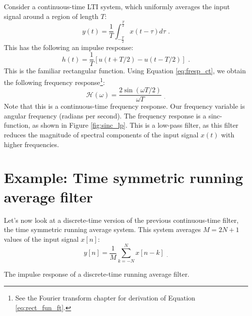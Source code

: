 Consider a continuous-time LTI system, which uniformly averages the
input signal around a region of length $T$:
\begin{equation}
y(t) = \frac{1}{T}\int_{-\frac{T}{2}}^{\frac{T}{2}} x(t-\tau)d\tau \,\,.
\end{equation}
This has the following an impulse response:
\begin{equation}
h(t)=\frac{1}{T}[u(t+T/2)-u(t-T/2)] \,\,.
\label{eq:rect_fun}
\end{equation}
This is the familiar rectangular function. Using
Equation \ref{eq:fresp_ct}, we obtain the following frequency
response\footnote{See the Fourier transform chapter for derivation of Equation \ref{eq:rect_fun_ft}.}:
\begin{equation}
\mathcal{H}(\omega)=\frac{2\sin(\omega T/2)}{\omega T} \,\, _.
\label{eq:rect_fun_ft}
\end{equation}
Note that this is a continuous-time frequency response. Our frequency
variable is angular frequency (radians per second). The frequency
response is a sinc-function, as shown in
Figure \ref{fig:sinc_lp}. This is a low-pass filter, as this filter
reduces the magnitude of spectral components of the input signal
$x(t)$ with higher frequencies.


\section{Example: Time symmetric running average filter}

Let's now look at a discrete-time version of the previous
continuous-time filter, the time symmetric running average
system. This system averages $M=2N+1$ values of the input signal
$x[n]$:
\begin{equation}
y[n] = \frac{1}{M} \sum_{k=-N}^{N} x[n-k] \,\, _.
\end{equation}

\begin{marginfigure}
\begin{center}
\end{center}
\caption{The impulse response of a discrete-time running average filter.}
\label{fig:rmf_ir}
\end{marginfigure}

